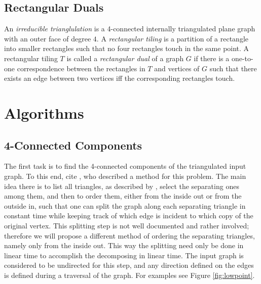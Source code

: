 \documentclass[a4paper]{article}
\begin{document}
\subsection{Rectangular Duals}
An \emph{irreducible trianglulation} is a 4-connected internally triangulated
plane graph with an outer face of degree $4$.
A \emph{rectangular tiling} is a partition of a rectangle into smaller
rectangles such that no four rectangles touch in the same point.
A rectangular tiling $T$ is called a \emph{rectangular dual} of a graph $G$ if
there is a one-to-one correspondence between the rectangles in $T$ and vertices
of $G$ such that there exists an edge between two vertices iff the corresponding
rectangles touch.

\section{Algorithms}\label{sec:algo}
\subsection{4-Connected Components}\label{sec:algo:decompose}
The first task is to find the 4-connected components of the triangulated input
graph.
To this end, \citet{ldrawing} cite \citet{kant}, who described a method for this
problem.
The main idea there is to list all triangles, as described by
\citet{triangles}, select the separating ones among them,
and then to order them, either from the inside out or from
the outside in, such that one can split the graph along each separating triangle
in constant time while keeping track of which edge is incident to which copy of
the original vertex.
This splitting step is not well documented and rather involved; therefore we
will propose a different method of ordering the separating triangles, namely
only from the inside out.
This way the splitting need only be done in linear time to accomplish the
decomposing in linear time.
The input graph is considered to be undirected for this step, and any direction
defined on the edges is defined during a traversal of the graph.
For examples see Figure \ref{fig:lowpoint}.
\end{document}
